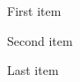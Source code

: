 \documentclass{beamer}
\begin{document}
\begin{frame}
\begin{enumerate}
  \item First item
  {
        \color{green}
      \item Second item
  }
  \item Last item
\end{enumerate}
\end{frame}
\end{document}
